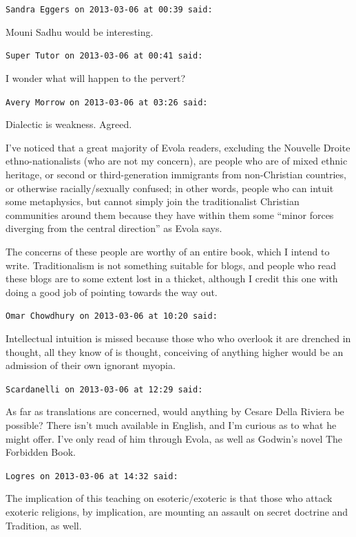 \begin{footnotesize}
\begin{sffamily}
\texttt{Sandra Eggers on 2013-03-06 at 00:39 said:}

Mouni Sadhu would be interesting.

\hfill

\texttt{Super Tutor on 2013-03-06 at 00:41 said:}

I wonder what will happen to the pervert?

\hfill

\texttt{Avery Morrow on 2013-03-06 at 03:26 said:}

Dialectic is weakness. Agreed.

I've noticed that a great majority of Evola readers, excluding the Nouvelle Droite ethno-nationalists (who are not my concern), are people who are of mixed ethnic heritage, or second or third-generation immigrants from non-Christian countries, or otherwise racially/sexually confused; in other words, people who can intuit some metaphysics, but cannot simply join the traditionalist Christian communities around them because they have within them some ``minor forces diverging from the central direction'' as Evola says.

The concerns of these people are worthy of an entire book, which I intend to write. Traditionalism is not something suitable for blogs, and people who read these blogs are to some extent lost in a thicket, although I credit this one with doing a good job of pointing towards the way out.

\hfill

\texttt{Omar Chowdhury on 2013-03-06 at 10:20 said:}

Intellectual intuition is missed because those who who overlook it are drenched in thought, all they know of is thought, conceiving of anything higher would be an admission of their own ignorant myopia.

\hfill

\texttt{Scardanelli on 2013-03-06 at 12:29 said:}

As far as translations are concerned, would anything by Cesare Della Riviera be possible? There isn't much available in English, and I'm curious as to what he might offer. I've only read of him through Evola, as well as Godwin's novel The Forbidden Book.

\hfill

\texttt{Logres on 2013-03-06 at 14:32 said:}

The implication of this teaching on esoteric/exoteric is that those who attack exoteric religions, by implication, are mounting an assault on secret doctrine and Tradition, as well.


\end{sffamily}
\end{footnotesize}
